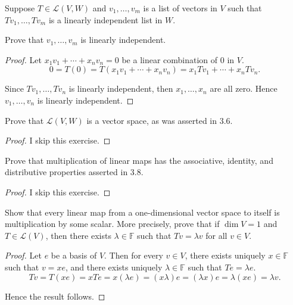 \begin{exercise}
    Suppose $T\in \mathcal{L}(V, W)$ and $v_{1}, \ldots, v_{m}$ is a list of vectors in $V$ such that $Tv_{1}, \ldots, Tv_{m}$ is a linearly independent list in $W$.

    Prove that $v_{1}, \ldots, v_{m}$ is linearly independent.
\end{exercise}

\begin{proof}
    Let $x_{1}v_{1} + \cdots + x_{n}v_{n} = 0$ be a linear combination of $0$ in $V$.
    \[
        0 = T(0) = T(x_{1}v_{1} + \cdots + x_{n}v_{n}) = x_{1}Tv_{1} + \cdots + x_{n}Tv_{n}.
    \]

    Since $Tv_{1}, \ldots, Tv_{n}$ is linearly independent, then $x_{1}, \ldots, x_{n}$ are all zero. Hence $v_{1}, \ldots, v_{n}$ is linearly independent.
\end{proof}
\newpage

\begin{exercise}
    Prove that $\mathcal{L}(V, W)$ is a vector space, as was asserted in 3.6.
\end{exercise}

\begin{proof}
    I skip this exercise.
\end{proof}
\newpage

\begin{exercise}
    Prove that multiplication of linear maps has the associative, identity, and distributive properties asserted in 3.8.
\end{exercise}

\begin{proof}
    I skip this exercise.
\end{proof}
\newpage

\begin{exercise}
    Show that every linear map from a one-dimensional vector space to itself is
    multiplication by some scalar. More precisely, prove that if $\dim V = 1$ and $T\in \mathcal{L}(V)$, then there exists $\lambda\in\mathbb{F}$ such that $Tv = \lambda v$ for all $v\in V$.
\end{exercise}

\begin{proof}
    Let $e$ be a basis of $V$. Then for every $v\in V$, there exists uniquely $x\in\mathbb{F}$ such that $v = xe$, and there exists uniquely $\lambda\in\mathbb{F}$ such that $Te = \lambda e$.
    \[
        Tv = T(xe) = xTe = x(\lambda e) = (x\lambda)e = (\lambda x)e = \lambda(xe) = \lambda v.
    \]

    Hence the result follows.
\end{proof}
\newpage

